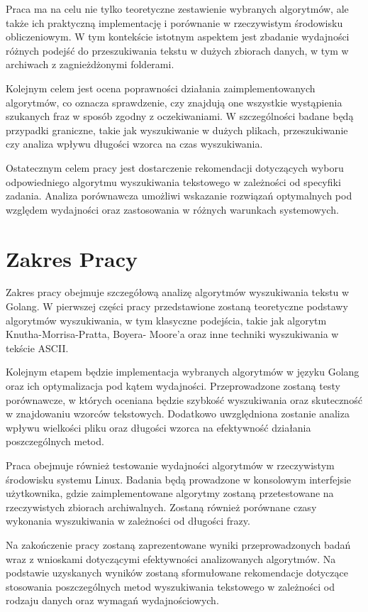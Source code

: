 Praca ma na celu nie tylko teoretyczne zestawienie wybranych algorytmów, ale 
także ich praktyczną implementację i porównanie w rzeczywistym środowisku 
obliczeniowym. W tym kontekście istotnym aspektem jest zbadanie wydajności 
różnych podejść do przeszukiwania tekstu w dużych zbiorach danych, w tym w 
archiwach z zagnieżdżonymi folderami.

Kolejnym celem jest ocena poprawności działania zaimplementowanych algorytmów, 
co oznacza sprawdzenie, czy znajdują one wszystkie wystąpienia szukanych fraz w 
sposób zgodny z oczekiwaniami. W szczególności badane będą przypadki graniczne, 
takie jak wyszukiwanie w dużych plikach, przeszukiwanie czy analiza wpływu 
długości wzorca na czas wyszukiwania.

Ostatecznym celem pracy jest dostarczenie rekomendacji dotyczących wyboru 
odpowiedniego algorytmu wyszukiwania tekstowego w zależności od specyfiki 
zadania. Analiza porównawcza umożliwi wskazanie rozwiązań optymalnych pod 
względem wydajności oraz zastosowania w różnych warunkach systemowych.

\section{Zakres Pracy}
Zakres pracy obejmuje szczegółową analizę algorytmów wyszukiwania tekstu w Golang.
W pierwszej części pracy przedstawione zostaną teoretyczne podstawy algorytmów wyszukiwania,
w tym klasyczne podejścia, takie jak algorytm Knutha-Morrisa-Pratta, Boyera-
Moore'a oraz inne techniki wyszukiwania w tekście ASCII.

Kolejnym etapem będzie implementacja wybranych algorytmów w języku Golang oraz 
ich optymalizacja pod kątem wydajności. Przeprowadzone zostaną testy porównawcze, 
w których oceniana będzie szybkość wyszukiwania oraz skuteczność w znajdowaniu
wzorców tekstowych. Dodatkowo uwzględniona zostanie analiza wpływu wielkości
pliku oraz długości wzorca na efektywność działania poszczególnych metod.

Praca obejmuje również testowanie wydajności algorytmów w rzeczywistym 
środowisku systemu Linux. Badania będą prowadzone w konsolowym interfejsie 
użytkownika, gdzie zaimplementowane algorytmy zostaną przetestowane na 
rzeczywistych zbiorach archiwalnych. Zostaną również porównane czasy wykonania
wyszukiwania w zależności od długości frazy.

Na zakończenie pracy zostaną zaprezentowane wyniki przeprowadzonych badań wraz 
z wnioskami dotyczącymi efektywności analizowanych algorytmów. Na podstawie 
uzyskanych wyników zostaną sformułowane rekomendacje dotyczące stosowania 
poszczególnych metod wyszukiwania tekstowego w zależności od rodzaju danych 
oraz wymagań wydajnościowych.


